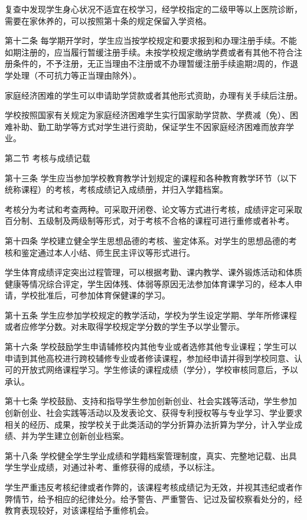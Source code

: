 \documentclass[UTF8,12pt,a4paper]{report}
\begin{document}
复查中发现学生身心状况不适宜在校学习，经学校指定的二级甲等以上医院诊断，需要在家休养的，可以按照第十条的规定保留入学资格。

第十二条 每学期开学时，学生应当按学校规定和要求报到和办理注册手续。不能如期注册的，应当履行暂缓注册手续。未按学校规定缴纳学费或者有其他不符合注册条件的，不予注册，无正当理由不注册或不办理暂缓注册手续逾期2周的，作退学处理（不可抗力等正当理由除外）。

家庭经济困难的学生可以申请助学贷款或者其他形式资助，办理有关手续后注册。

学校按照国家有关规定为家庭经济困难学生实行国家助学贷款、学费减（免）、困难补助、勤工助学等方式对学生进行资助，保证学生不因家庭经济困难而放弃学业。

第二节 考核与成绩记载

第十三条 学生应当参加学校教育教学计划规定的课程和各种教育教学环节（以下统称课程）的考核，考核成绩记入成绩册，并归入学籍档案。　　

考核分为考试和考查两种。可采取开闭卷、论文等方式进行考核，成绩评定可采取百分制、五级制及两级制等形式，对于考核不合格的课程可进行重修或者补考。

第十四条 学校建立健全学生思想品德的考核、鉴定体系。对学生的思想品德的考核和鉴定通过本人小结、师生民主评议等形式进行。

学生体育成绩评定突出过程管理，可以根据考勤、课内教学、课外锻炼活动和体质健康等情况综合评定，学生因体残、体弱等原因无法参加体育课学习的，经本人申请，学校批准后，可参加体育保健课的学习。

第十五条 学生应参加学校规定的教学活动，学校为学生设定学期、学年所修课程或者应修学分数。对未取得学校规定学分数的学生予以学业警示。

第十六条 学校鼓励学生申请辅修校内其他专业或者选修其他专业课程；学生可以申请到其他高校进行跨校辅修专业或者修读课程，参加经申请并得到学校同意、认可的开放式网络课程学习。学生修读的课程成绩（学分），学校审核同意后，予以承认。

第十七条 学校鼓励、支持和指导学生参加创新创业、社会实践等活动，学生参加创新创业、社会实践等活动以及发表论文、获得专利授权等与专业学习、学业要求相关的经历、成果，按学校关于此类活动的学分折算办法折算为学分，计入学业成绩、并为学生建立创新创业档案。

第十八条 学校健全学生学业成绩和学籍档案管理制度，真实、完整地记载、出具学生学业成绩，对通过补考、重修获得的成绩，予以标注。

学生严重违反考核纪律或者作弊的，该课程考核成绩记为无效，并视其违纪或者作弊情节，给予相应的纪律处分。给予警告、严重警告、记过及留校察看处分的，经教育表现较好，对该课程给予重修机会。
\end{document}
